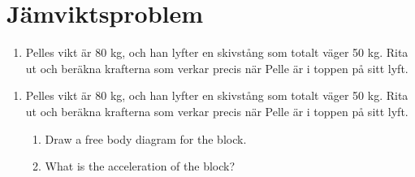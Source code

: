 \documentclass[12pt]{article}
\begin{document}
\section{Jämviktsproblem}

\begin{enumerate}
    \item Pelles vikt är 80 kg, och han lyfter en skivstång som totalt väger 50 kg. Rita ut och beräkna krafterna som verkar precis när Pelle är i toppen på sitt lyft.
\end{enumerate}

\begin{enumerate}
    \item Pelles vikt är 80 kg, och han lyfter en skivstång som totalt väger 50 kg. Rita ut och beräkna krafterna som verkar precis när Pelle är i toppen på sitt lyft.
          \begin{enumerate}
              \item Draw a free body diagram for the block.
              \item What is the acceleration of the block?
          \end{enumerate}
\end{enumerate}
\end{document}

